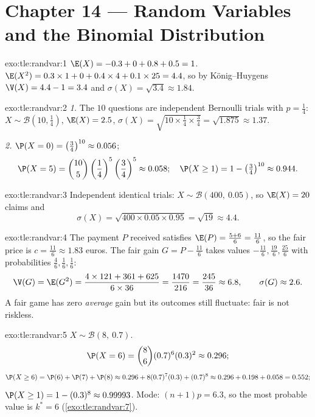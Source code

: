 \section*{Chapter 14 --- Random Variables and the Binomial Distribution}

\begin{solution}{exo:tle:randvar:1}
$\E(X) = -0.3 + 0 + 0.8 + 0.5 = 1$.
$\E(X^2) = 0.3 \times 1 + 0 + 0.4\times4 + 0.1\times25 = 4.4$, so by
König--Huygens $\V(X) = 4.4 - 1 = 3.4$ and
$\sigma(X) = \sqrt{3.4} \approx 1.84$.
\end{solution}

\begin{solution}{exo:tle:randvar:2}
\emph{1.} The $10$ questions are independent Bernoulli trials with
$p = \frac14$: $X \sim \mathcal B\left(10, \frac14\right)$,
$\E(X) = 2.5$,
$\sigma(X) = \sqrt{10 \times \frac14 \times \frac34} = \sqrt{1.875}
\approx 1.37$.

\emph{2.} $\P(X = 0) = \left(\frac34\right)^{10} \approx 0.056$;
\[
\P(X = 5) = \binom{10}{5}\left(\frac14\right)^5\left(\frac34\right)^5
\approx 0.058;
\quad
\P(X \geq 1) = 1 - \left(\tfrac34\right)^{10} \approx 0.944 .
\]
\end{solution}

\begin{solution}{exo:tle:randvar:3}
Independent identical trials: $X \sim \mathcal B(400,\ 0.05)$, so
$\E(X) = 20$ claims and
\[
\sigma(X) = \sqrt{400 \times 0.05 \times 0.95} = \sqrt{19} \approx 4.4 .
\]
\end{solution}

\begin{solution}{exo:tle:randvar:4}
The payment $P$ received satisfies
$\E(P) = \frac{5 + 6}{6} = \frac{11}{6}$, so the fair price is
$c = \frac{11}{6} \approx 1.83$ euros. The fair gain $G = P - \frac{11}6$
takes values $-\frac{11}{6}, \frac{19}{6}, \frac{25}{6}$ with probabilities
$\frac46, \frac16, \frac16$:
\[
\V(G) = \E(G^2)
= \frac{4 \times 121 + 361 + 625}{6 \times 36} = \frac{1470}{216}
= \frac{245}{36} \approx 6.8,
\qquad \sigma(G) \approx 2.6 .
\]
A fair game has zero \emph{average} gain but its outcomes still fluctuate:
fair is not riskless.
\end{solution}

\begin{solution}{exo:tle:randvar:5}
$X \sim \mathcal B(8,\ 0.7)$.
\[
\P(X = 6) = \binom86 (0.7)^6(0.3)^2 \approx 0.296 ;
\]
\[
\P(X \geq 6) = \P(6) + \P(7) + \P(8)
\approx 0.296 + 8(0.7)^7(0.3) + (0.7)^8
\approx 0.296 + 0.198 + 0.058 = 0.552 ;
\]
$\P(X \geq 1) = 1 - (0.3)^8 \approx 0.99993$. Mode:
$(n+1)p = 6.3$, so the most probable value is $k^* = 6$
(\cref{exo:tle:randvar:7}).
\end{solution}

